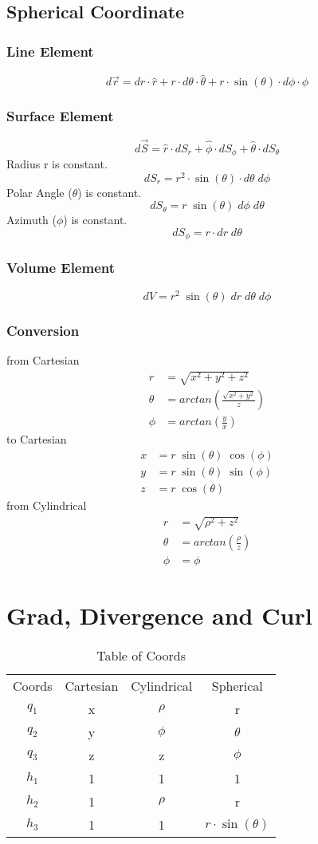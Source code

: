 \documentclass[a4paper]{report}
\begin{document}
\subsection{Spherical Coordinate}
\subsubsection{Line Element}
$$d\vec{r}=dr\cdot\hat{r}+r\cdot d\theta\cdot \hat{\theta}+r\cdot \sin(\theta)\cdot d\phi\cdot \hat{\phi}$$
\subsubsection{Surface Element}
$$d\vec{S}=\hat{r}\cdot dS_r+\hat{\phi}\cdot dS_\phi+\hat{\theta}\cdot dS_\theta$$
Radius r is constant. 
$$dS_r=r^2\cdot\sin(\theta)\cdot d\theta\;d\phi$$
Polar Angle ($\theta$) is constant. 
$$ dS_\theta=r\;\sin(\theta)\;d\phi\;d\theta $$
Azimuth ($\phi$) is constant. 
$$dS_\phi=r\cdot dr\;d\theta$$
\subsubsection{Volume Element}
$$dV=r^2\;\sin(\theta)\;dr\;d\theta\;d\phi$$
\subsubsection{Conversion}
from Cartesian
\begin{align*}
    r&=\sqrt{x^2+y^2+z^2}\\
    \theta&=arctan(\frac{\sqrt{x^2+y^2}}{z})\\
    \phi&=arctan(\frac{y}{x})
\end{align*}
to Cartesian
\begin{align*}
    x&=r\;\sin(\theta)\;\cos(\phi)\\
    y&=r\;\sin(\theta)\;\sin(\phi)\\
    z&=r\;\cos(\theta)
\end{align*}
from Cylindrical
\begin{align*}
    r&=\sqrt{\rho^2+z^2}\\
    \theta&=arctan(\frac{\rho}{z})\\
    \phi&=\phi
\end{align*}
\section{Grad, Divergence and Curl}
\begin{table}[h]
  \centering
  \begin{tabular}{c c c c}
    Coords&Cartesian&Cylindrical&Spherical \\
    $q_1$&x&$\rho$&r \\
    $q_2$&y&$\phi$&$\theta$ \\
    $q_3$&z&z&$\phi$ \\
    \hline
    $h_1$&1&1&1 \\
    $h_2$&1&$\rho$&r \\
    $h_3$&1&1&$r\cdot\sin(\theta)$ \\
  \end{tabular}
  \caption{Table of Coords}
\end{table}
\end{document}
